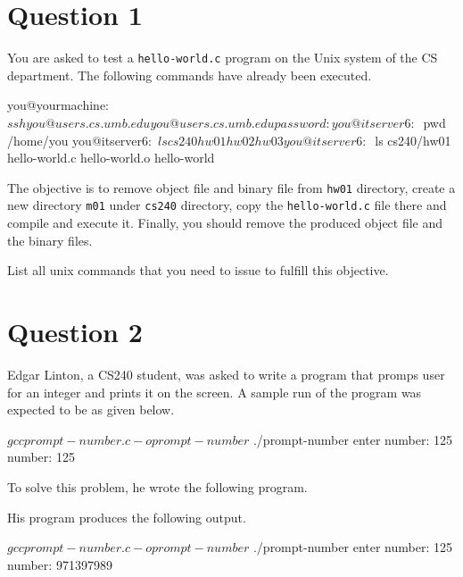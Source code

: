 \documentclass[12pt,letterpaper,twoside]{article}
\begin{document}


\section*{Question 1}

You are asked to test a \texttt{hello-world.c} program on the Unix system of the CS department.
The following commands have already been executed.

\begin{terminal}
you@yourmachine:~$ ssh you@users.cs.umb.edu
you@users.cs.umb.edu password:
you@itserver6:~$ pwd
/home/you
you@itserver6:~$ ls cs240
hw01 hw02 hw03
you@itserver6:~$ ls cs240/hw01
hello-world.c hello-world.o hello-world
\end{terminal}

The objective is to remove object file and binary file from \texttt{hw01} directory, create a new directory \texttt{m01} under \texttt{cs240} directory, copy the \texttt{hello-world.c} file there and compile and execute it.
Finally, you should remove the produced object file and the binary files.

List all unix commands that you need to issue to fulfill this objective.

\newpage

\section*{Question 2}

Edgar Linton, a CS240 student, was asked to write a program that promps user for an integer and prints it on the screen.
A sample run of the program was expected to be as given below.

\begin{terminal}
$ gcc prompt-number.c -o prompt-number
$ ./prompt-number
enter number: 125
number: 125
\end{terminal}

To solve this problem, he wrote the following program.

\lstset{language=c,tabsize=4}


His program produces the following output.

\begin{terminal}
$ gcc prompt-number.c -o prompt-number
$ ./prompt-number
enter number: 125
number: 971397989
\end{terminal}
\end{document}
